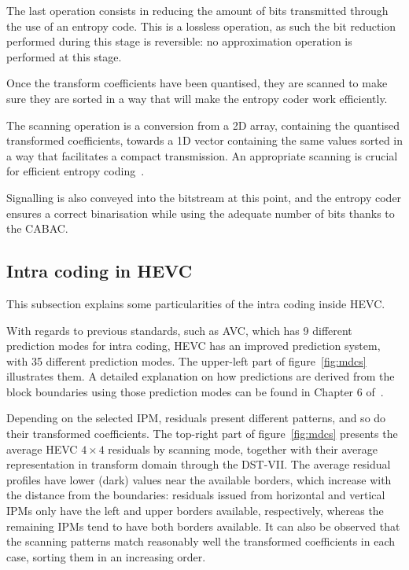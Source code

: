 \documentclass[11pt,a4paper,openright,twoside]{book}
\numberwithin{equation}{section} %
\numberwithin{figure}{section} %
\numberwithin{table}{section} %
\begin{document}
The last operation consists in reducing the amount of bits transmitted through
the use of an entropy code.
This is a lossless operation, as such the bit reduction performed during this
stage is reversible: no approximation operation is performed at this stage.

Once the transform coefficients have been quantised, they are scanned to make
sure they are sorted in a way that will make the entropy coder work
efficiently.

The scanning operation is a conversion from a 2D array, containing the
quantised transformed coefficients, towards a 1D vector containing the same
values sorted in a way that facilitates a compact transmission.
An appropriate scanning is crucial for efficient entropy
coding~\cite{ye-08-intra-directional-scanning-mddt}.

Signalling is also conveyed into the bitstream at this point, and the
entropy coder ensures a correct binarisation while using the adequate
number of bits thanks to the \ac{CABAC}.

\subsection{Intra coding in \acs{HEVC}}
\label{sub:intra_coding_in_hevc}

This subsection explains some particularities of the intra coding inside
\ac{HEVC}.

With regards to previous standards, such as \ac{AVC}, which has 9 different
prediction modes for intra coding, \ac{HEVC} has an improved prediction
system, with 35 different prediction modes.
The upper-left part of figure~\ref{fig:mdcs} illustrates them.
A detailed explanation on how predictions are derived from the block
boundaries using those prediction modes can be found in Chapter 6
of~\cite{wien-15-hevc}.

Depending on the selected \ac{IPM}, residuals present different patterns, and
so do their transformed coefficients.
The top-right part of figure~\ref{fig:mdcs} presents the average \ac{HEVC}
$4\times4$ residuals by scanning mode, together with their average
representation in transform domain through the \acs{DST}-VII.
The average residual profiles have lower (dark) values near the available
borders, which increase with the distance from the boundaries: residuals
issued from horizontal and vertical \acp{IPM} only have the left and upper
borders available, respectively, whereas the remaining \acp{IPM} tend to have
both borders available.
It can also be observed that the scanning patterns match reasonably well the
transformed coefficients in each case, sorting them in an increasing order.
\end{document}
